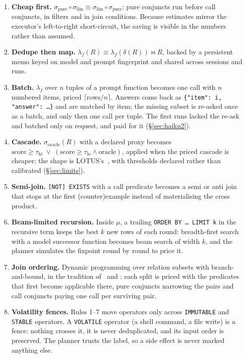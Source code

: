 \documentclass[11pt,a4paper]{article}
\newcommand{\code}[1]{\texttt{#1}}
\newcommand{\lmap}{\lambda_f}
\begin{document}
\begin{enumerate}[leftmargin=1.5em,itemsep=1pt]
\item \textbf{Cheap first.} $\sigma_{\text{pure}} \circ \sigma_{\text{llm}}
  \equiv \sigma_{\text{llm}} \circ \sigma_{\text{pure}}$: pure conjuncts run
  before call conjuncts, in filters and in join conditions. Because estimates
  mirror the executor's left-to-right short-circuit, the saving is visible in
  the numbers rather than assumed.
\item \textbf{Dedupe then map.} $\lmap(R) \equiv \lmap(\delta(R)) \bowtie R$,
  backed by a persistent memo keyed on model and prompt fingerprint and shared
  across sessions and runs.
\item \textbf{Batch.} $\lmap$ over $n$ tuples of a prompt function becomes
  one call with $n$ numbered items, priced $\lceil \text{rows}/n \rceil$.
  Answers come back as \code{\{"item": i, "answer": \ldots\}} and are
  matched by item; the missing subset is re-asked once as a batch, and only
  then one call per tuple. The first runs lacked the re-ask and batched only
  on request, and paid for it (\S\ref{sec:haiku2}).
\item \textbf{Cascade.} $\sigma_{\text{oracle}}(R)$ with a declared proxy becomes
  $\text{score} \ge \tau_{\text{hi}} \;\vee\; (\text{score} \ge \tau_{\text{lo}}
  \wedge \text{oracle})$, applied when the priced cascade is cheaper; the shape
  is LOTUS's~\citep{patel2025semantic}, with thresholds declared rather than
  calibrated (\S\ref{sec:limits}).
\item \textbf{Semi-join.} \code{[NOT] EXISTS} with a call predicate becomes a
  semi or anti join that stops at the first (counter)example instead of
  materialising the cross product.
\item \textbf{Beam-limited recursion.} Inside $\mu$, a trailing \code{ORDER BY
  \ldots{} LIMIT k} in the recursive term keeps the best $k$ new rows of each
  round: breadth-first search with a model successor function becomes beam
  search of width $k$, and the planner simulates the fixpoint round by round
  to price it.
\item \textbf{Join ordering.} Dynamic programming over relation subsets with
  branch-and-bound, in the tradition of~\citet{selinger1979access} and
  \citet{moerkotte2006analysis}: each split is priced with the predicates that
  first become applicable there, pure conjuncts narrowing the pairs and call
  conjuncts paying one call per surviving pair.
\item \textbf{Volatility fences.} Rules 1--7 move operators only across
  \code{IMMUTABLE} and \code{STABLE} operators. A \code{VOLATILE} operator (a
  shell command, a file write) is a fence: nothing crosses it, it is never
  deduplicated, and its input order is preserved. The planner trusts the label,
  so a side effect is never marked anything else.
\end{enumerate}
\end{document}
